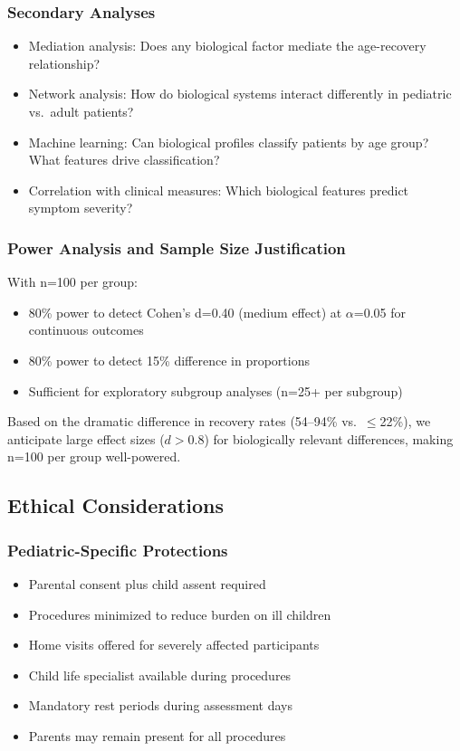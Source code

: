\subsubsection{Secondary Analyses}
\begin{itemize}
    \item Mediation analysis: Does any biological factor mediate the age-recovery relationship?
    \item Network analysis: How do biological systems interact differently in pediatric vs.\ adult patients?
    \item Machine learning: Can biological profiles classify patients by age group? What features drive classification?
    \item Correlation with clinical measures: Which biological features predict symptom severity?
\end{itemize}

\subsubsection{Power Analysis and Sample Size Justification}
With n=100 per group:
\begin{itemize}
    \item 80\% power to detect Cohen's d=0.40 (medium effect) at $\alpha$=0.05 for continuous outcomes
    \item 80\% power to detect 15\% difference in proportions
    \item Sufficient for exploratory subgroup analyses (n=25+ per subgroup)
\end{itemize}

Based on the dramatic difference in recovery rates (54--94\% vs.\ $\leq$22\%), we anticipate large effect sizes ($d>0.8$) for biologically relevant differences, making n=100 per group well-powered.

\subsection{Ethical Considerations}

\subsubsection{Pediatric-Specific Protections}
\begin{itemize}
    \item Parental consent plus child assent required
    \item Procedures minimized to reduce burden on ill children
    \item Home visits offered for severely affected participants
    \item Child life specialist available during procedures
    \item Mandatory rest periods during assessment days
    \item Parents may remain present for all procedures
\end{itemize}

